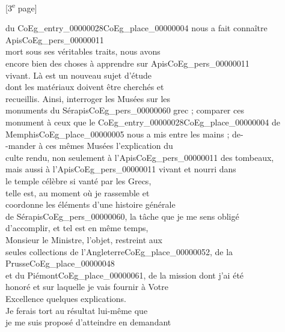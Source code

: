 \documentclass{book}
\begin{document}
{{\footnotesize\begin{center} {[3\textsuperscript{e} page]}\end{center}}

\begin{paracol}{2}
\switchcolumn
\noindent du \Gls{CoEg_entry_00000028}\gls{CoEg_place_00000004} nous a fait connaître Apis\gls{CoEg_pers_00000011}\\
mort sous ses véritables traits, nous avons\\
encore bien des choses à apprendre sur Apis\gls{CoEg_pers_00000011}\\
vivant. Là est un nouveau sujet d’étude\\
dont les matériaux doivent être cherchés et\\
recueillis. Ainsi, interroger les Musées sur les\\
monuments du Sérapis\gls{CoEg_pers_00000060} grec ; comparer ces\\
monument à ceux que le \Gls{CoEg_entry_00000028}\gls{CoEg_place_00000004} de\\
Memphis\gls{CoEg_place_00000005} nous a mis entre les mains ; de-\\
-mander à ces mêmes Musées l’explication du\\
culte rendu, non seulement à l’Apis\gls{CoEg_pers_00000011} des tombeaux,\\
mais aussi à l’Apis\gls{CoEg_pers_00000011} vivant et nourri dans\\
le temple célèbre si vanté par les Grecs,\\
telle est, au moment où je rassemble et\\
coordonne les éléments d’une histoire générale\\
de Sérapis\gls{CoEg_pers_00000060}, la tâche que je me sens obligé\\
d’accomplir, et tel est en même temps,\\
Monsieur le Ministre, l’objet, restreint aux\\
seules collections de l’Angleterre\gls{CoEg_place_00000052}, de la Prusse\gls{CoEg_place_00000048}\\
et du Piémont\gls{CoEg_place_00000061}, de la mission dont j’ai été\\
honoré et sur laquelle je vais fournir à Votre\\
Excellence quelques explications.\\
\indent Je ferais tort au résultat lui-même que\\
je me suis proposé d’atteindre en demandant\\

\end{paracol}}
\end{document}
